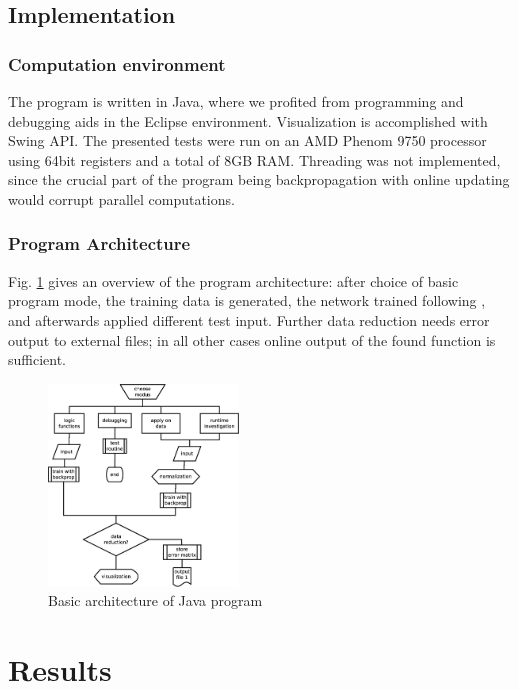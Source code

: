 \documentclass[useAMS,usenatbib]{mn2e}
\begin{document}
\subsection{Implementation}
\subsubsection{Computation environment}
The program is written in {\sc Java}, where we profited from
programming and debugging aids in the {\sc Eclipse}
environment. Visualization is accomplished with {\sc Swing} API. The
presented tests were run on an AMD Phenom 9750 processor using 64bit
registers and a total of 8GB RAM. Threading was not implemented, since
the crucial part of the program being backpropagation with online
updating would corrupt parallel computations.

\subsubsection{Program Architecture}
Fig. \ref{fig:flow} gives an overview of the program architecture:
after choice of basic program mode, the training data is generated,
the network trained following \cite{Stoop2010}, and afterwards applied
different test input. Further data reduction needs error output to
external files; in all other cases online output of the found function
is sufficient.
\begin{figure}
  \begin{center}
    \includegraphics[width=0.45\textwidth]{fig/dia.eps}
  \end{center}
  \caption{\label{fig:flow}Basic architecture of {\rm Java} program}
\end{figure}
%
%
\section{Results}
\label{sec:Results}
%
\end{document}
